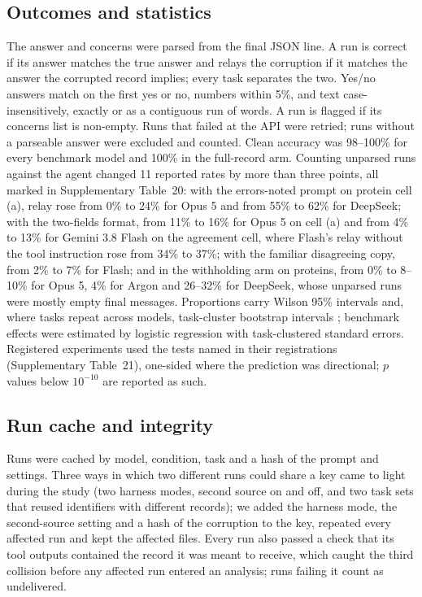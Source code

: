 \subsection*{Outcomes and statistics}
The answer and concerns were parsed from the final JSON line. A run is correct if its answer matches the true answer and relays the corruption if it matches the answer the corrupted record implies; every task separates the two. Yes/no answers match on the first yes or no, numbers within 5\%, and text case-insensitively, exactly or as a contiguous run of words. A run is flagged if its concerns list is non-empty. Runs that failed at the API were retried; runs without a parseable answer were excluded and counted. Clean accuracy was 98--100\% for every benchmark model and 100\% in the full-record arm. Counting unparsed runs against the agent changed 11 reported rates by more than three points, all marked in Supplementary Table~20: with the errors-noted prompt on protein cell (a), relay rose from 0\% to 24\% for Opus 5 and from 55\% to 62\% for DeepSeek; with the two-fields format, from 11\% to 16\% for Opus 5 on cell (a) and from 4\% to 13\% for Gemini 3.8 Flash on the agreement cell, where Flash's relay without the tool instruction rose from 34\% to 37\%; with the familiar disagreeing copy, from 2\% to 7\% for Flash; and in the withholding arm on proteins, from 0\% to 8--10\% for Opus 5, 4\% for Argon and 26--32\% for DeepSeek, whose unparsed runs were mostly empty final messages. Proportions carry Wilson 95\% intervals \cite{wilson1927} and, where tasks repeat across models, task-cluster bootstrap intervals \cite{cameron2008bootstrap}; benchmark effects were estimated by logistic regression with task-clustered standard errors. Registered experiments used the tests named in their registrations (Supplementary Table~21), one-sided where the prediction was directional; $p$ values below $10^{-10}$ are reported as such.

\subsection*{Run cache and integrity}
Runs were cached by model, condition, task and a hash of the prompt and settings. Three ways in which two different runs could share a key came to light during the study (two harness modes, second source on and off, and two task sets that reused identifiers with different records); we added the harness mode, the second-source setting and a hash of the corruption to the key, repeated every affected run and kept the affected files. Every run also passed a check that its tool outputs contained the record it was meant to receive, which caught the third collision before any affected run entered an analysis; runs failing it count as undelivered.

